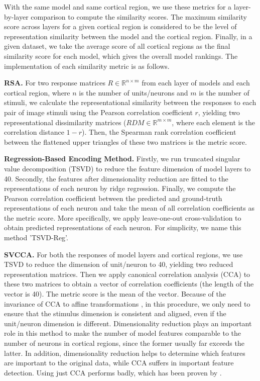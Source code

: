 \documentclass[letterpaper]{article} %
\begin{document}
With the same model and same cortical region, we use these metrics for a layer-by-layer comparison to compute the similarity scores. The maximum similarity score across layers for a given cortical region is considered to be the level of representation similarity between the model and the cortical region. Finally, in a given dataset, we take the average score of all cortical regions as the final similarity score for each model, which gives the overall model rankings. The implementation of each similarity metric is as follows. 

\textbf{RSA.} For two response matrices $R \in \mathbb{R}^{n \times m}$ from each layer of models and each cortical region, where $n$ is the number of units/neurons and $m$ is the number of stimuli, we calculate the representational similarity between the responses to each pair of image stimuli using the Pearson correlation coefficient $r$, yielding two representational dissimilarity matrices ($RDM \in \mathbb{R}^{m \times m}$, where each element is the correlation distance $1 - r$). Then, the Spearman rank correlation coefficient between the flattened upper triangles of these two matrices is the metric score.

\textbf{Regression-Based Encoding Method.} Firstly, we run truncated singular value decomposition (TSVD) to reduce the feature dimension of model layers to 40. Secondly, the features after dimensionality reduction are fitted to the representations of each neuron by ridge regression. Finally, we compute the Pearson correlation coefficient between the predicted and ground-truth representations of each neuron and take the mean of all correlation coefficients as the metric score. More specifically, we apply leave-one-out cross-validation to obtain predicted representations of each neuron. For simplicity, we name this method 'TSVD-Reg'.

\textbf{SVCCA.} For both the responses of model layers and cortical regions, we use TSVD to reduce the dimension of unit/neuron to 40, yielding two reduced representation matrices. Then we apply canonical correlation analysis (CCA) to these two matrices to obtain a vector of correlation coefficients (the length of the vector is 40). The metric score is the mean of the vector. Because of the invariance of CCA to affine transformations \cite{raghu2017svcca}, in this procedure, we only need to ensure that the stimulus dimension is consistent and aligned, even if the unit/neuron dimension is different. Dimensionality reduction plays an important role in this method to make the number of model features comparable to the number of neurons in cortical regions, since the former usually far exceeds the latter. In addition, dimensionality reduction helps to determine which features are important to the original data, while CCA suffers in important feature detection. Using just CCA performs badly, which has been proven by \cite{raghu2017svcca}.
\end{document}
